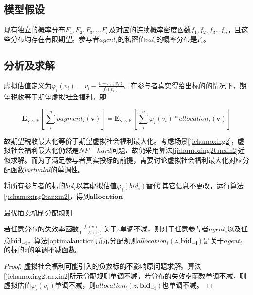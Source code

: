 \documentclass[promaster]{thesis-uestc}
\begin{document}
\subsection{模型假设}

现有独立的概率分布$F_1,F_2,F_3,...F_n$及对应的连续概率密度函数$f_1,f_2,f_3...f_n$，且这些分布均存在有限期望。参与者$agent_i$的私密值$val_i$的概率分布是$F_i$。

\subsection{分析及求解}
虚拟估值定义为$\varphi _i(v_i)=v_i-\frac{1-F_i(v_i)}{f_i(v_i)}$。在参与者真实得给出标的的情况下，期望税收等于期望虚拟社会福利。即 

\begin{equation}
    \mathbf{E}_{\mathbf{v}\sim\mathbf{F}}{\left[\sum_{i}^{n}{payment_i(\mathbf{v})}\right]}=\mathbf{E}_{\mathbf{v}\sim\mathbf{F}}{\left[\sum_{i}^{n}{\varphi _i(v_i)*allocation_i(\mathbf{v})}\right]}
\end{equation}

故期望税收最大化等价于期望虚拟社会福利最大化。考虑场景\ref{jichumoxing2}，虚拟社会福利最大化仍然是$NP-hard$问题，故仍采用算法\ref{jichumoxing2tanxin2}近似求解。而为了满足参与者真实投标的前提，需要讨论虚拟社会福利最大化对应分配函数$virtualal$的单调性。

\begin{algorithm}[H] 
    将所有参与者的标的$bid_i$以其虚拟估值$\varphi _i(bid_i)$替代\;
    其它信息不更改，运行算法\ref{jichumoxing2tanxin2}，得到$\mathbf{allocation}$\;
\caption{最优拍卖机制分配规则}
\label{optimalauction}
\end{algorithm}



\begin{theorem}
若任意分布的失效率函数$\frac{f_i(v)}{1-F_i(v)}$关于$v$单调不减，则对于任意参与者$agent_i$以及任意$\mathbf{bid_{-i}}$，算法\ref{optimalauction}所示分配规则$allocation_i(z,\mathbf{bid_{-i}})$是关于$agent_i$的标的$z$的单调不减函数。
\end{theorem}

\begin{proof}
虚拟社会福利可能引入的负数标的不影响原问题求解。算法\ref{jichumoxing2tanxin2}所示分配规则单调不减，若分布的失效率函数单调不减，则虚拟估值$\varphi _i(v_i)$单调不减，则$allocation_i(z,\mathbf{bid_{-i}})$也单调不减。
\end{proof}
\end{document}
